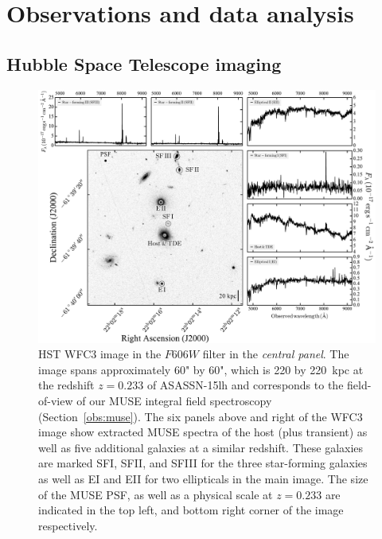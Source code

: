\documentclass[traditabstract]{aa}
\begin{document}
\section{Observations and data analysis}
\label{sec:Obs}

\subsection{Hubble Space Telescope imaging}
\label{obs:hst}


\begin{figure}
  \includegraphics[width=0.999\linewidth]{fig/MUSE_ASASSN-15lh_wfc.pdf}
\caption{HST WFC3 image in the $F606W$ filter in the \textit{central panel}. The image spans approximately 60" by 60", which is 220 by 220~kpc at the redshift $z=0.233$ of ASASSN-15lh and corresponds to the field-of-view of our MUSE integral field spectroscopy (Section~\ref{obs:muse}). The six panels above and right of the WFC3 image show extracted MUSE spectra of the host (plus transient) as well as five additional galaxies at a similar redshift. These galaxies are marked SFI, SFII, and SFIII for the three star-forming galaxies as well as EI and EII for two ellipticals in the main image. The size of the MUSE PSF, as well as a physical scale at $z=0.233$ are indicated in the top left, and bottom right corner of the image respectively.}
\label{fig:fc}
\end{figure}
\end{document}
